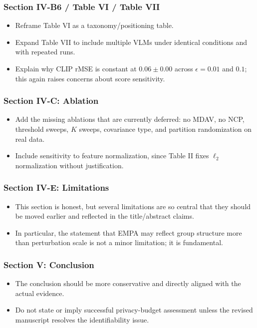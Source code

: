 \subsubsection*{Section IV-B6 / Table VI / Table VII}
\begin{itemize}
    \item Reframe Table VI as a taxonomy/positioning table.
    \item Expand Table VII to include multiple VLMs under identical conditions and with repeated runs.
    \item Explain why CLIP rMSE is constant at $0.06 \pm 0.00$ across $\epsilon=0.01$ and $0.1$; this again raises concerns about score sensitivity.
\end{itemize}

\subsubsection*{Section IV-C: Ablation}
\begin{itemize}
    \item Add the missing ablations that are currently deferred: no MDAV, no NCP, threshold sweeps, $K$ sweeps, covariance type, and partition randomization on real data.
    \item Include sensitivity to feature normalization, since Table II fixes $\ell_2$ normalization without justification.
\end{itemize}

\subsubsection*{Section IV-E: Limitations}
\begin{itemize}
    \item This section is honest, but several limitations are so central that they should be moved earlier and reflected in the title/abstract claims.
    \item In particular, the statement that EMPA may reflect group structure more than perturbation scale is not a minor limitation; it is fundamental.
\end{itemize}

\subsubsection*{Section V: Conclusion}
\begin{itemize}
    \item The conclusion should be more conservative and directly aligned with the actual evidence.
    \item Do not state or imply successful privacy-budget assessment unless the revised manuscript resolves the identifiability issue.
\end{itemize}

